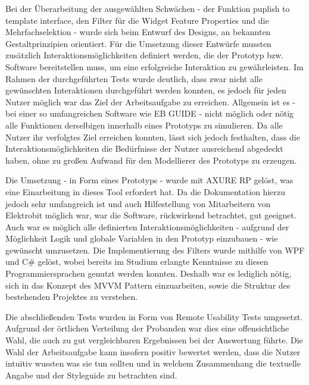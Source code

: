 Bei der Überarbeitung der ausgewählten Schwächen - der Funktion  \glqq puplish to template interface\grqq{}, den Filter für die \glqq Widget Feature Properties\grqq{} und die \glqq Mehrfachselektion\grqq{} - wurde sich beim Entwurf des Designs, an bekannten Gestaltprinzipien orientiert.
Für die Umsetzung dieser Entwürfe mussten zusätzlich Interaktionsmöglichkeiten definiert werden, die der Prototyp bzw. Software bereitstellen muss, um eine erfolgreiche Interaktion zu gewährleisten.
Im Rahmen der durchgeführten Tests wurde deutlich, dass zwar nicht alle gewünschten Interaktionen durchgeführt werden konnten, es jedoch für jeden Nutzer möglich war das Ziel der Arbeitsaufgabe zu erreichen.
Allgemein ist es - bei einer so umfangreichen Software wie EB GUIDE - nicht möglich oder nötig alle Funktionen derselbigen innerhalb eines Prototyps zu simulieren.
Da alle Nutzer ihr verfolgtes Ziel erreichen konnten, lässt sich jedoch festhalten, dass die Interaktionsmöglichkeiten die Bedürfnisse der Nutzer ausreichend abgedeckt haben, ohne zu großen Aufwand für den Modellierer des Prototyps zu erzeugen.

Die Umsetzung - in Form eines Prototyps - wurde mit AXURE RP gelöst, was eine Einarbeitung in dieses Tool erfordert hat.
Da die Dokumentation hierzu jedoch sehr umfangreich ist und auch Hilfestellung von Mitarbeitern von Elektrobit möglich war, war die Software, rückwirkend betrachtet, gut geeignet.
Auch war es möglich alle definierten Interaktionsmöglichkeiten - aufgrund der Möglichkeit Logik und globale Variablen in den Prototyp einzubauen - wie gewünscht umzusetzen.
Die Implementierung des Filters wurde mithilfe von WPF und C\# gelöst, wobei bereits im Studium erlangte Kenntnisse zu diesen Programmiersprachen genutzt werden konnten.
Deshalb war es lediglich nötig, sich in das Konzept des MVVM Pattern einzuarbeiten, sowie die Struktur des bestehenden Projektes zu verstehen.

Die abschließenden Tests wurden in Form von Remote Usability Tests umgesetzt.
Aufgrund der örtlichen Verteilung der Probanden war dies eine offensichtliche Wahl, die auch zu gut vergleichbaren Ergebnissen bei der Auswertung führte.
Die Wahl der Arbeitsaufgabe kann insofern positiv bewertet werden, dass die Nutzer intuitiv wussten was sie tun sollten und in welchem Zusammenhang die textuelle Angabe und der Styleguide zu betrachten sind.

